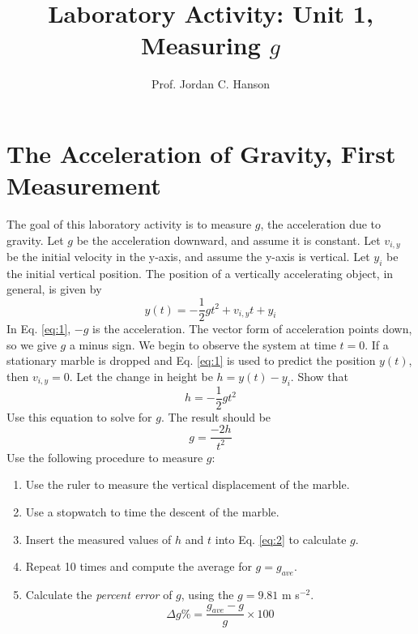 \documentclass{article}
\begin{document}
\title{Laboratory Activity: Unit 1, Measuring $g$}
\author{Prof. Jordan C. Hanson}

\maketitle

\section{The Acceleration of Gravity, First Measurement}

The goal of this laboratory activity is to measure $g$, the acceleration due to gravity.  Let $g$ be the acceleration downward, and assume it is constant.  Let $v_{i,y}$ be the initial velocity in the y-axis, and assume the y-axis is vertical.  Let $y_i$ be the initial vertical position.  The position of a vertically accelerating object, in general, is given by
\begin{equation}
y(t) = -\frac{1}{2}gt^2 + v_{i,y} t + y_i \label{eq:1}
\end{equation}
In Eq. \ref{eq:1}, $-g$ is the acceleration.  The vector form of acceleration points down, so we give $g$ a minus sign.  We begin to observe the system at time $t=0$.  If a stationary marble is dropped and Eq. \ref{eq:1} is used to predict the position $y(t)$, then $v_{i,y} = 0$.  Let the change in height be $h = y(t) - y_i$.  Show that
\begin{equation}
h = -\frac{1}{2}g t^2
\end{equation}
Use this equation to solve for $g$.  The result should be
\begin{equation}
g = \frac{-2h}{t^2} \label{eq:2}
\end{equation}
Use the following procedure to measure $g$:
\begin{enumerate}
\item Use the ruler to measure the vertical displacement of the marble.
\item Use a stopwatch to time the descent of the marble.
\item Insert the measured values of $h$ and $t$ into Eq. \ref{eq:2} to calculate $g$.
\item Repeat 10 times and compute the average for $g = g_{ave}$.
\item Calculate the \textit{percent error} of $g$, using the $g = 9.81$ m s$^{-2}$.
\begin{equation}
\Delta g\% = \frac{g_{ave} - g}{g} \times 100
\end{equation}
\end{enumerate}
\end{document}
